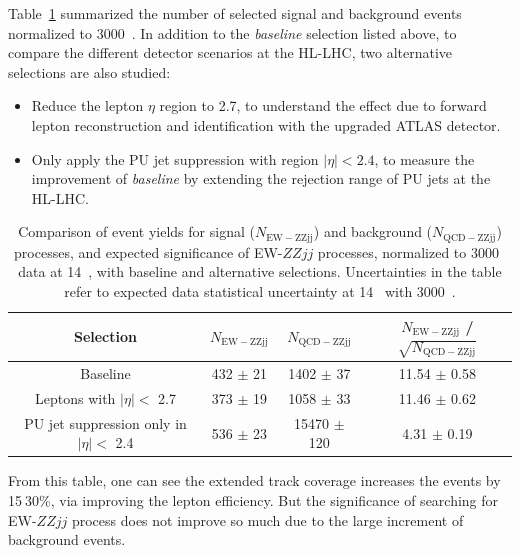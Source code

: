 Table~\ref{tab:event_yield} summarized the number of selected signal and background events normalized to 3000~\ifb.
In addition to the \textit{baseline} selection listed above, to compare the different detector scenarios at the HL-LHC, two alternative selections are also studied:
\begin{itemize}
	\item Reduce the lepton $\eta$ region to 2.7, to understand the effect due to forward lepton reconstruction and identification with the upgraded ATLAS detector.
	\item Only apply the PU jet suppression with region $|\eta| < 2.4$, to measure the improvement of \textit{baseline} by extending the rejection range of PU jets at the HL-LHC.
\end{itemize}
\begin{table}[htbp]
  \small
  \centering
  \begin{tabular}{|c|c|c|c|}
    \hline
    Selection & $N_{\mathrm{EW-ZZjj}}$ & $N_{\mathrm{QCD-ZZjj}}$ & $N_{\mathrm{EW-ZZjj}}$ / $\sqrt{N_{\mathrm{QCD-ZZjj}}}$ \\
    \hline
    Baseline                                 & 432 $\pm$ 21 & 1402 $\pm$ 37   & 11.54 $\pm$ 0.58 \\
    \hline
    Leptons with $|\eta|<$ 2.7               & 373 $\pm$ 19 & 1058 $\pm$ 33   & 11.46 $\pm$ 0.62 \\
    \hline
    PU jet suppression only in $|\eta|<$ 2.4 & 536 $\pm$ 23 & 15470 $\pm$ 120 &  4.31 $\pm$ 0.19  \\
    \hline
  \end{tabular}
  \caption{
    Comparison of event yields for signal ($N_{\mathrm{EW-ZZjj}}$) and background ($N_{\mathrm{QCD-ZZjj}}$) processes, 
    and expected significance of EW-$ZZjj$ processes,
    normalized to 3000~\ifb{} data at 14~\TeV{},
    with baseline and alternative selections.
    Uncertainties in the table refer to expected data statistical uncertainty at 14~\TeV{} with 3000~\ifb{}.
  }
  \label{tab:event_yield}
\end{table}
From this table, one can see the extended track coverage increases the \lllljj events by 15$~$30\%, via improving the lepton efficiency.
But the significance of searching for EW-$ZZjj$ process does not improve so much due to the large increment of background events.

